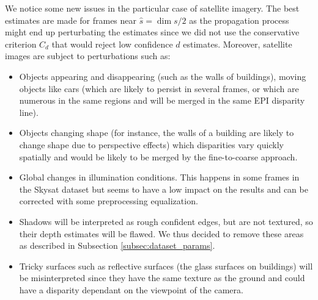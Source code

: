 \documentclass{article}
\theoremstyle{definition}
\begin{document}
We notice some new issues in the particular case of satellite imagery. The best estimates are made for frames near $\widehat{s} = \dim s / 2$ as the propagation process might end up perturbating the estimates since we did not use the conservative criterion $C_d$ that would reject low confidence $d$ estimates. Moreover, satellite images are subject to perturbations such as:
\begin{itemize}
 \item Objects appearing and disappearing (such as the walls of buildings), moving objects like cars (which are likely to persist in several frames, or which are numerous in the same regions and will be merged in the same EPI disparity line).
 \item Objects changing shape (for instance, the walls of a building are likely to change shape due to perspective effects) which disparities vary quickly spatially and would be likely to be merged by the fine-to-coarse approach.
 \item Global changes in illumination conditions. This happens in some frames in the Skysat dataset but seems to have a low impact on the results and can be corrected with some preprocessing equalization.
 \item Shadows will be interpreted as rough confident edges, but are not textured, so their depth estimates will be flawed. We thus decided to remove these areas as described in Subsection \ref{subsec:dataset_params}.
 \item Tricky surfaces such as reflective surfaces (the glass surfaces on buildings) will be misinterpreted since they have the same texture as the ground and could have a disparity dependant on the viewpoint of the camera.
\end{itemize}
\end{document}
